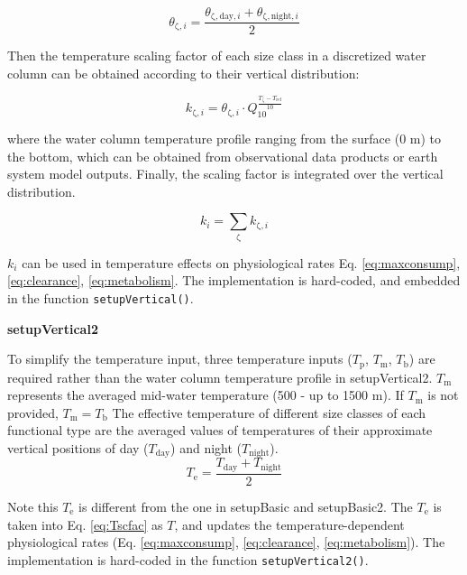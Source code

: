 \documentclass[
]{article}
\begin{document}
\begin{equation}
  \theta_{\mathrm{\zeta},i} = \frac{\theta_{\mathrm{\zeta},\mathrm{day},i}+\theta_{\mathrm{\zeta},\mathrm{night},i}}{2}
\end{equation}

Then the temperature scaling factor of each size class in a discretized
water column can be obtained according to their vertical distribution:

\begin{equation}
k_{\mathrm{\zeta},i} = \theta_{\mathrm{\zeta},i} \cdot Q_{10}^{\frac{T_{\mathrm{\zeta}}-T_{\mathrm{ref}}}{10}}
\end{equation}

where the water column temperature profile ranging from the surface (0
m) to the bottom, which can be obtained from observational data products
or earth system model outputs. Finally, the scaling factor is integrated
over the vertical distribution.

\begin{equation}
k_{i} = \sum\limits_{\mathrm{\zeta}} k_{\mathrm{\zeta},i}
\end{equation}

\(k_{i}\) can be used in temperature effects on physiological rates Eq.
\ref{eq:maxconsump}, \ref{eq:clearance}, \ref{eq:metabolism}. The
implementation is hard-coded, and embedded in the function
\texttt{setupVertical()}.

\textbf{setupVertical2}

To simplify the temperature input, three temperature inputs
(\(T_{\mathrm{p}}\), \(T_{\mathrm{m}}\), \(T_{\mathrm{b}}\)) are
required rather than the water column temperature profile in
setupVertical2. \(T_{\mathrm{m}}\) represents the averaged mid-water
temperature (500 - up to 1500 m). If \(T_{\mathrm{m}}\) is not provided,
\(T_{\mathrm{m}} = T_{\mathrm{b}}\) The effective temperature of
different size classes of each functional type are the averaged values
of temperatures of their approximate vertical positions of day
(\(T_{\mathrm{day}}\)) and night (\(T_{\mathrm{night}}\)).
\begin{equation}
T_{\mathrm{e}} = \frac{T_{\mathrm{day}}+T_{\mathrm{night}}}{2}
\end{equation}

Note this \(T_{\mathrm{e}}\) is different from the one in setupBasic and
setupBasic2. The \(T_{\mathrm{e}}\) is taken into Eq. \ref{eq:Tscfac} as
\(T\), and updates the temperature-dependent physiological rates (Eq.
\ref{eq:maxconsump}, \ref{eq:clearance}, \ref{eq:metabolism}). The
implementation is hard-coded in the function \texttt{setupVertical2()}.
\end{document}
